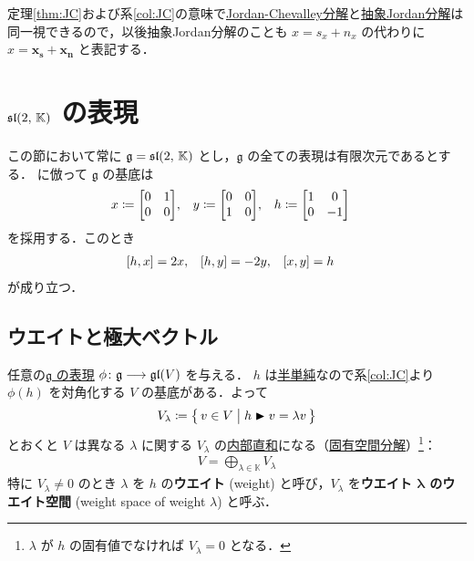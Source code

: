 \documentclass[rep_main]{subfiles}
\begin{document}
\begin{marker}
	定理\ref{thm:JC}および系\ref{col:JC}の意味で\hyperref[prop:Jordan-Chevalley]{Jordan-Chevalley分解}と\hyperref[def:abstruct-JC]{抽象Jordan分解}は同一視できるので，以後抽象Jordan分解のことも $x = s_x + n_x$ の代わりに $x = \bm{x_s} + \bm{x_n}$ と表記する．
\end{marker}


\section{$\mathfrak{sl}(2,\, \mathbb{K})$ の表現}

この節において常に $\mathfrak{g} = \mathfrak{sl}(2,\, \mathbb{K})$ とし，$\mathfrak{g}$ の全ての表現は有限次元であるとする．
に倣って $\mathfrak{g}$ の基底は
\begin{align}
	x &\coloneqq \mqty[0 & 1 \\ 0 & 0], &
	y &\coloneqq \mqty[0 & 0 \\ 1 & 0], &
	h &\coloneqq \mqty[1 & 0 \\ 0 & -1]
\end{align}
を採用する．このとき
\begin{align}
	\label{eq:sl2}
	\comm{h}{x} &= 2x, &
	\comm{h}{y} &= -2y, &
	\comm{x}{y} &= h
\end{align}
が成り立つ．

\subsection{ウエイトと極大ベクトル}

任意の\hyperref[ax:g-module]{$\mathfrak{g}$ の表現} $\phi \colon \mathfrak{g} \longrightarrow \mathfrak{gl}(V)$ を与える．
$h$ は\hyperref[def:semisimple-end]{半単純}なので系\ref{col:JC}より $\phi(h)$ を対角化する $V$ の基底がある．よって
\begin{align}
	\label{def:weight-space}
	V_\lambda \coloneqq \bigl\{\, v \in V \bigm| h \blacktriangleright v = \lambda v \,\bigr\} 
\end{align}
とおくと $V$ は異なる $\lambda$ に関する $V_\lambda$ の\hyperref[prop:subvec-directsum]{内部直和}になる（\hyperref[thm:eigen-decomp1]{固有空間分解}）\footnote{$\lambda$ が $h$ の固有値でなければ $V_\lambda = 0$ となる．}：
\begin{align}
	\label{def:weight-space-decomp}
	V = \bigoplus_{\lambda \in \mathbb{K}} V_\lambda
\end{align}
特に $V_\lambda \neq 0$ のとき $\lambda$ を $h$ の\textbf{ウエイト} (weight) と呼び，$V_\lambda$ を\textbf{ウエイト $\bm{\lambda}$ のウエイト空間} (weight space of weight $\lambda$) と呼ぶ．
\end{document}
